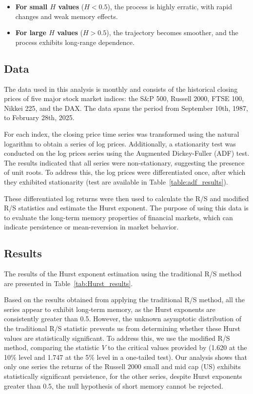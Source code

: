 \documentclass[11pt]{extarticle}
\begin{document}
\begin{itemize}
    \item \textbf{For small \( H \) values} (\( H < 0.5 \)), the process is highly erratic, with rapid changes and weak memory effects.
    \item \textbf{For large \( H \) values} (\( H > 0.5 \)), the trajectory becomes smoother, and the process exhibits long-range dependence.
\end{itemize}


\subsection{Data}
\label{sec:data}

The data used in this analysis is monthly and consists of the historical closing prices of five major stock market indices: the S\&P 500,
Russell 2000, FTSE 100, Nikkei 225, and the DAX.
The data spans the period from September 10th, 1987, to February 28th, 2025.

For each index, the closing price time series was transformed using the natural logarithm to obtain a series of log prices.
Additionally, a stationarity test was conducted on the log prices series using the Augmented Dickey-Fuller (ADF) test.
The results indicated that all series were non-stationary, suggesting the presence of unit roots.
To address this, the log prices were differentiated once, after which they exhibited stationarity (test are available
in Table~\ref{table:adf_results}).

These differentiated log returns were then used to calculate the R/S and modified R/S statistics and estimate the Hurst exponent.
The purpose of using this data is to evaluate the long-term memory properties of financial markets, which can indicate
persistence or mean-reversion in market behavior.



\subsection{Results}
\label{sec:results}

The results of the Hurst exponent estimation using the traditional R/S method are presented in Table~\ref{tab:Hurst_results}.

\FloatBarrier

Based on the results obtained from applying the traditional R/S method, all the series appear to exhibit long-term memory,
as the Hurst exponents are consistently greater than 0.5. However, the unknown asymptotic distribution of the traditional R/S
statistic prevents us from determining whether these Hurst values are statistically significant. To address this, we use the modified
R/S method, comparing the statistic \( V \) to the critical values provided by \cite{lo1991} (1.620 at the 10\% level and 1.747 at the 5\%
level in a one-tailed test). Our analysis shows that only one series the returns of the Russell 2000 small and mid cap (US) exhibits
statistically significant persistence, for the other series, despite Hurst exponents greater than 0.5, the null hypothesis of short memory cannot be rejected.
\end{document}
